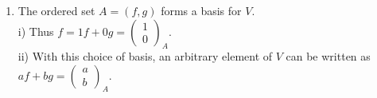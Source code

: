 \documentclass[12pt]{article}
\def\b{\beta}
\def\ba{\left(\begin{array}{cc}}
\def\bv{\left(\begin{array}{c}}
\def\ev{\end{array}\right) }
\begin{document}
\begin{enumerate}
\begin{enumerate}
\[\sim
\left( \begin{array}{cc|c}
12&28&4\\
12&15&0\\
0&-11&0
\end{array}\right)
\sim
\left( \begin{array}{cc|c}
12&28&4\\
0&-13&-4\\
0&1&0
\end{array}\right)
\sim
\left(\begin{array}{cc|c}
12&0&4\\
0&0&-4\\
0&1&0
\end{array}\right)
\]
encodes an inconsistent system of equations. \\

ii) An arbitrary supply package, meaning an arbitrary element of $V$, is of the form $af+bg$ with $a,b\in \mathbb{R}$. Since
\[f=3e_S+4e_f+6e_b=\bv 3\\4\\6 \ev~,~~g=7e_s+5e_f+3e_b = \bv 7\\5\\3 \ev_B\]
we can write 
\[
af+bg= a\bv 3\\4\\6 \ev_B+b \bv 7\\5\\3 \ev_B= \left[\ba 3&7 \\4&5\\6&3 \ev \bv a\\b \ev\right]_B.
\]




\item The ordered set $A=(f,g)$ forms a basis for $V$. 
\\
i) Thus $f=1f+0g=\bv 1\\0 \ev_A$.
\\
ii) With this choice of basis, an arbitrary element of $V$ can be written as  $af+bg=\bv a\\b \ev_A.$ 
\end{enumerate}
\end{enumerate}
\end{document}
